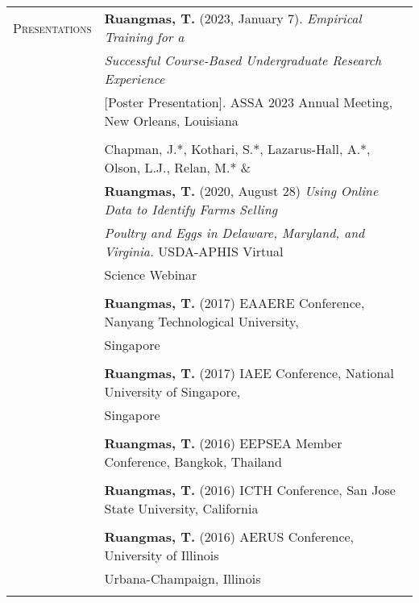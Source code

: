 \documentclass[letterpaper,11pt,oneside]{article}\usepackage[]{graphicx}\usepackage[]{xcolor}
\begin{document}
\noindent \begin{tabular}{p{1.2in} l}	                         
\textsc{Presentations}  & \textbf{Ruangmas, T.} (2023, January 7). \textit{Empirical Training for a }\\
                        & \textit{Successful Course-Based Undergraduate Research Experience} \\
                        & [Poster Presentation]. ASSA 2023 Annual Meeting, New Orleans, Louisiana\\
                        & \\
                        & Chapman, J.*, Kothari, S.*, Lazarus-Hall, A.*, Olson, L.J., Relan, M.* \& \\
                        & \textbf{Ruangmas, T.} (2020, August 28) \textit{Using Online Data to Identify Farms Selling}\\
                        & \textit{Poultry and Eggs in Delaware, Maryland, and Virginia.} USDA-APHIS Virtual\\
                        & Science Webinar\\
                        & \\
                        & \textbf{Ruangmas, T.} (2017) EAAERE Conference, Nanyang Technological University, \\
                        & Singapore \\
	                      & \\
                        & \textbf{Ruangmas, T.} (2017) IAEE Conference, National University of Singapore, \\
                        & Singapore \\
                        & \\
                        & \textbf{Ruangmas, T.} (2016) EEPSEA Member Conference, Bangkok, Thailand \\
                        & \\
                        & \textbf{Ruangmas, T.} (2016) ICTH Conference, San Jose State University, California \\
                        & \\
                        & \textbf{Ruangmas, T.} (2016) AERUS Conference, University of Illinois \\
                        & Urbana-Champaign, Illinois \\
                        & \\
\end{tabular}
\end{document}
